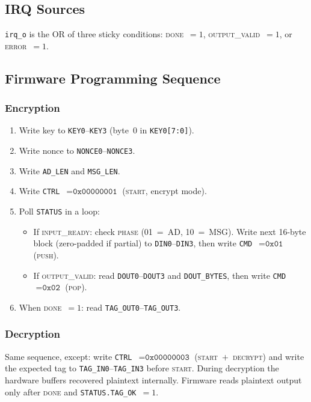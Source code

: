 \documentclass[11pt,a4paper]{article}
\begin{document}
\subsection{IRQ Sources}

\texttt{irq\_o} is the OR of three sticky conditions:
\textsc{done}~$= 1$, \textsc{output\_valid}~$= 1$, or \textsc{error}~$= 1$.

\subsection{Firmware Programming Sequence}

\subsubsection*{Encryption}
\begin{enumerate}
  \item Write key to \texttt{KEY0}--\texttt{KEY3} (byte~0 in \texttt{KEY0[7:0]}).
  \item Write nonce to \texttt{NONCE0}--\texttt{NONCE3}.
  \item Write \texttt{AD\_LEN} and \texttt{MSG\_LEN}.
  \item Write \texttt{CTRL}~$= \texttt{0x00000001}$ (\textsc{start}, encrypt mode).
  \item Poll \texttt{STATUS} in a loop:
    \begin{itemize}
      \item If \textsc{input\_ready}: check \textsc{phase} (01~=~AD, 10~=~MSG).
            Write next 16-byte block (zero-padded if partial) to \texttt{DIN0}--\texttt{DIN3},
            then write \texttt{CMD}~$= \texttt{0x01}$ (\textsc{push}).
      \item If \textsc{output\_valid}: read \texttt{DOUT0}--\texttt{DOUT3} and
            \texttt{DOUT\_BYTES}, then write \texttt{CMD}~$= \texttt{0x02}$ (\textsc{pop}).
    \end{itemize}
  \item When \textsc{done}~$= 1$: read \texttt{TAG\_OUT0}--\texttt{TAG\_OUT3}.
\end{enumerate}

\subsubsection*{Decryption}
Same sequence, except: write \texttt{CTRL}~$= \texttt{0x00000003}$
(\textsc{start}~$+$~\textsc{decrypt}) and write the expected tag to
\texttt{TAG\_IN0}--\texttt{TAG\_IN3} before \textsc{start}. During
decryption the hardware buffers recovered plaintext internally. Firmware reads
plaintext output only after \textsc{done} and \texttt{STATUS.TAG\_OK}~$= 1$.
\end{document}
